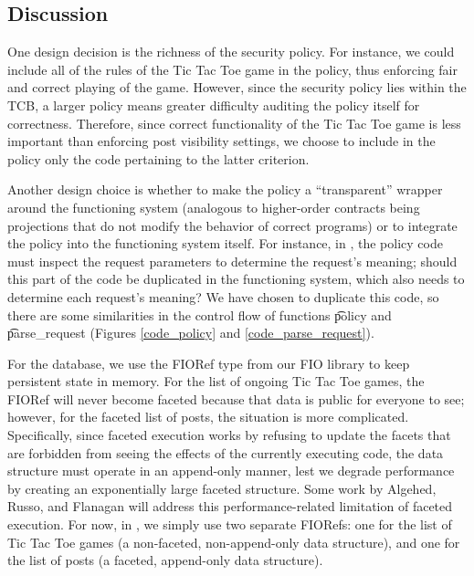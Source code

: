 \begin{refsection}
\section{Discussion}

One design decision is the richness of the security policy.
%
For instance, we could include all of the rules of the Tic Tac Toe game in the policy,
thus enforcing fair and correct playing of the game.
%
However, since the security policy lies within the TCB,
a larger policy means greater difficulty auditing the policy itself for correctness.
%
Therefore, since correct functionality of the Tic Tac Toe game is less important than enforcing post visibility settings,
we choose to include in the policy only the code pertaining to the latter criterion.

Another design choice is whether to make the policy a ``transparent'' wrapper around the functioning system
(analogous to higher-order contracts being projections \cite{findler2006contracts} that do not modify the behavior of correct programs)
or
to integrate the policy into the functioning system itself.
%
For instance, in \myapp{},
the policy code must inspect the request parameters to determine the request's meaning;
should this part of the code be duplicated in the functioning system,
which also needs to determine each request's meaning?
%
We have chosen to duplicate this code,
so there are some similarities in the control flow of functions \t{policy} and \t{parse\_request} (Figures \ref{code_policy} and \ref{code_parse_request}).

For the database, we use the FIORef type from our FIO library to keep persistent state in memory.
%
For the list of ongoing Tic Tac Toe games,
the FIORef will never become faceted because that data is public for everyone to see;
however, for the faceted list of posts,
the situation is more complicated.
%
Specifically, since faceted execution works by refusing to update the facets that are forbidden from seeing the effects of the currently executing code,
the data structure must operate in an append-only manner,
lest we degrade performance by creating an exponentially large faceted structure.
%
Some work by Algehed, Russo, and Flanagan \cite{algehed2019optimizing} will address this performance-related limitation of faceted execution.
%
For now, in \myapp{}, we simply use two separate FIORefs:
one for the list of Tic Tac Toe games (a non-faceted, non-append-only data structure),
and one for the list of posts (a faceted, append-only data structure).



\printbibliography

\end{refsection}

